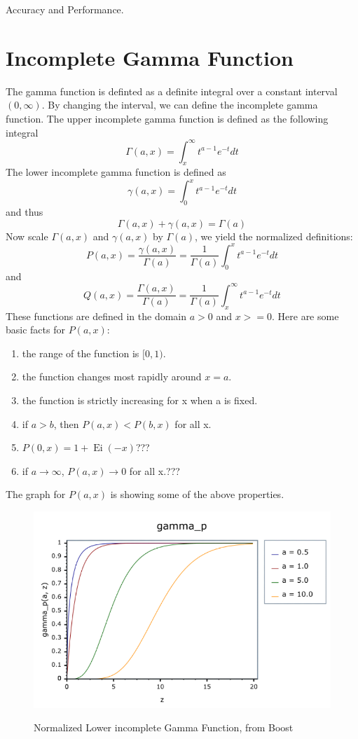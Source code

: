 Accuracy and Performance.

\section{Incomplete Gamma Function}
The gamma function is definted as a definite integral over a constant interval $(0, \infty)$. By changing the interval, we can define the incomplete gamma function. The upper incomplete gamma function is defined as the following integral
\[ \Gamma(a, x) = \int_x^\infty t^{a-1} e^{-t}dt\]
The lower incomplete gamma function is defined as
\[ \gamma(a, x) = \int_0^x t^{a-1} e^{-t}dt\]
and thus 
\[ \Gamma(a, x) + \gamma(a, x) = \Gamma(a) \]
Now scale $\Gamma(a, x)$ and $\gamma(a, x)$ by $\Gamma(a)$, we yield the normalized definitions:
\[ P(a, x) = \frac{\gamma(a, x)}{\Gamma(a)} = \frac{1}{\Gamma(a)}\int_0^x t^{a-1} e^{-t}dt\]
and 
\[ Q(a, x) = \frac{\Gamma(a, x)}{\Gamma(a)} = \frac{1}{\Gamma(a)}\int_x^\infty t^{a-1} e^{-t}dt\]
These functions are defined in the domain $a > 0$ and $x >= 0$. Here are some basic facts for $P(a, x)$:
\begin{enumerate}
\item the range of the function is $[0, 1)$.
\item the function changes most rapidly around $x = a$.
\item the function is strictly increasing for x when a is fixed.
\item if $a > b$, then $P(a, x) < P(b, x)$ for all x.
\item $P(0, x) = 1 + \operatorname{Ei}(-x)$???
\item if $a \rightarrow \infty$, $P(a, x) \rightarrow 0$ for all x.???
\end{enumerate}
The graph for $P(a, x)$ is showing some of the above properties.
\begin{figure}[htp]
\begin{center}
{
\includegraphics[bb=0 0 600 400,width=1\textwidth] {chap3/gammap.png}
}
\end{center}
\caption{Normalized Lower incomplete Gamma Function, from Boost}
\label{figure:gammapfunction}
\end{figure}

